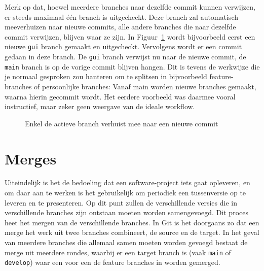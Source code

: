 Merk op dat, hoewel meerdere branches naar dezelfde commit kunnen verwijzen, er steeds maximaal \'e\'en branch is uitgecheckt. Deze branch zal automatisch meeverhuizen naar nieuwe commits, alle andere branches die naar dezelfde commit verwijzen, blijven waar ze zijn. In Figuur~\ref{fig:new-branch} wordt bijvoorbeeld eerst een nieuwe \texttt{gui} branch gemaakt en uitgecheckt. Vervolgens wordt er een commit gedaan in deze branch. De \texttt{gui} branch verwijst nu naar de nieuwe commit, de \texttt{main} branch is op de vorige commit blijven hangen. Dit is tevens de werkwijze die je normaal gesproken zou hanteren om te splitsen in bijvoorbeeld feature-branches of persoonlijke branches: Vanaf main worden nieuwe branches gemaakt, waarna hierin gecommit wordt. Het eerdere voorbeeld was daarmee vooral instructief, maar zeker geen weergave van de ideale workflow.

\begin{figure}[ht]
\label{fig:new-branch}
\caption{Enkel de actieve branch verhuist mee naar een nieuwe commit}
\end{figure}

\section{Merges} \label{sec:merge}
Uiteindelijk is het de bedoeling dat een software-project iets gaat opleveren, en om daar aan te werken is het gebruikelijk om periodiek een tussenversie op te leveren en te presenteren. Op dit punt zullen de verschillende versies die in verschillende branches zijn ontstaan moeten worden samengevoegd. Dit proces heet het mergen van de verschillende branches. In Git is het doorgaans zo dat een merge het werk uit twee branches combineert, de source en de target. In het geval van meerdere branches die allemaal samen moeten worden gevoegd bestaat de merge uit meerdere rondes, waarbij er een target branch is (vaak \texttt{main} of \texttt{develop}) waar een voor een de feature branches in worden gemerged.

